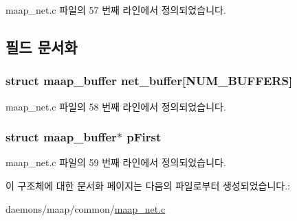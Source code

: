 maap\+\_\+net.\+c 파일의 57 번째 라인에서 정의되었습니다.



\subsection{필드 문서화}
\subsubsection[{\texorpdfstring{net\+\_\+buffer}{net_buffer}}]{\setlength{\rightskip}{0pt plus 5cm}struct {\bf maap\+\_\+buffer} net\+\_\+buffer\mbox{[}{\bf N\+U\+M\+\_\+\+B\+U\+F\+F\+E\+RS}\mbox{]}}\hypertarget{structmaap__net_a627d243adeb3b72479c5a09aa7d6e2d9}{}\label{structmaap__net_a627d243adeb3b72479c5a09aa7d6e2d9}


maap\+\_\+net.\+c 파일의 58 번째 라인에서 정의되었습니다.

\subsubsection[{\texorpdfstring{p\+First}{pFirst}}]{\setlength{\rightskip}{0pt plus 5cm}struct {\bf maap\+\_\+buffer}$\ast$ p\+First}\hypertarget{structmaap__net_afb79ef5b6ddb7d9fc9be7ae916af425a}{}\label{structmaap__net_afb79ef5b6ddb7d9fc9be7ae916af425a}


maap\+\_\+net.\+c 파일의 59 번째 라인에서 정의되었습니다.



이 구조체에 대한 문서화 페이지는 다음의 파일로부터 생성되었습니다.\+:\begin{DoxyCompactItemize}
\item 
daemons/maap/common/\hyperlink{maap__net_8c}{maap\+\_\+net.\+c}\end{DoxyCompactItemize}
